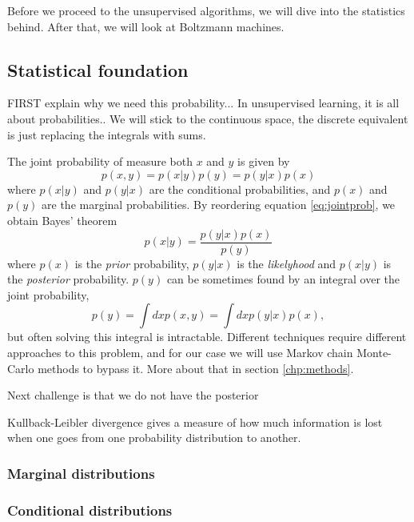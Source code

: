 Before we proceed to the unsupervised algorithms, we will dive into the statistics behind. After that, we will look at Boltzmann machines. 

\subsection{Statistical foundation}
FIRST explain why we need this probability... In unsupervised learning, it is all about probabilities.. We will stick to the continuous space, the discrete equivalent is just replacing the integrals with sums. 

The joint probability of measure both $x$ and $y$ is given by
\begin{equation}
p(x,y)=p(x|y)p(y)=p(y|x)p(x)
\label{eq:jointprob}
\end{equation}
where $p(x|y)$ and $p(y|x)$ are the conditional probabilities, and $p(x)$ and $p(y)$ are the marginal probabilities. By reordering equation \eqref{eq:jointprob}, we obtain Bayes' theorem
\begin{equation}
p(x|y)=\frac{p(y|x)p(x)}{p(y)}
\end{equation}
where $p(x)$ is the \textit{prior} probability, $p(y|x)$ is the \textit{likelyhood} and $p(x|y)$ is the \textit{posterior} probability. $p(y)$ can be sometimes found by an integral over the joint probability,
\begin{equation}
p(y)=\int dx p(x,y) = \int dx p(y|x)p(x),
\end{equation}
but often solving this integral is intractable. Different techniques require different approaches to this problem, and for our case we will use Markov chain Monte-Carlo methods to bypass it. More about that in section \eqref{chp:methods}. 

Next challenge is that we do not have the posterior

Kullback-Leibler divergence gives a measure of how much information is lost when one goes from one probability distribution to another. 

\subsubsection{Marginal distributions}

\subsubsection{Conditional distributions}

